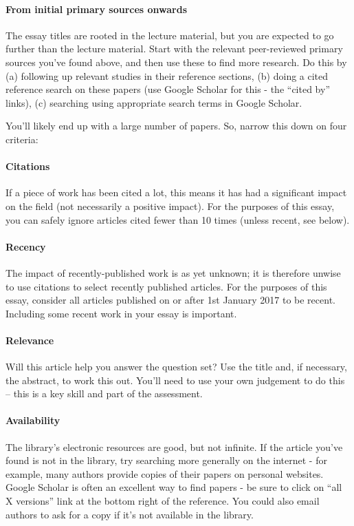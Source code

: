 \documentclass[11pt]{article}
\begin{document}
\paragraph{From initial primary sources onwards} The essay titles are rooted in the lecture material, but you are expected to go further than the lecture material. Start with the relevant peer-reviewed primary sources you've found above, and then use these to find more research. Do this by (a) following up relevant studies in their reference sections, (b) doing a cited reference search on these papers (use Google Scholar for this - the ``cited by'' links), (c) searching using appropriate search terms in Google Scholar.  

You'll likely end up with a large number of papers. So, narrow this down on four criteria:

\paragraph{Citations} If a piece of work has been cited a lot, this means it has had a significant impact on the field (not necessarily a positive impact). For the purposes of this essay, you can safely ignore articles cited fewer than 10 times (unless recent, see below).

\paragraph{Recency} The impact of recently-published work is as yet unknown; it is therefore unwise to use citations to select recently published articles. For the purposes of this essay, consider all articles published on or after 1st January 2017 to be recent. Including some recent work in your essay is important.

\paragraph{Relevance} Will this article help you answer the question set? Use the title and, if necessary, the abstract, to work this out. You'll need to use your own judgement to do this -- this is a key skill and part of the assessment.

\paragraph{Availability} The library's electronic resources are good, but not infinite. If the article you've found is not in the library, try searching more generally on the internet - for example, many authors provide copies of their papers on personal websites. Google Scholar is often an excellent way to find papers - be sure to click on ``all X versions'' link at the bottom right of the reference. You could also email authors to ask for a copy if it's not available in the library.
\end{document}
